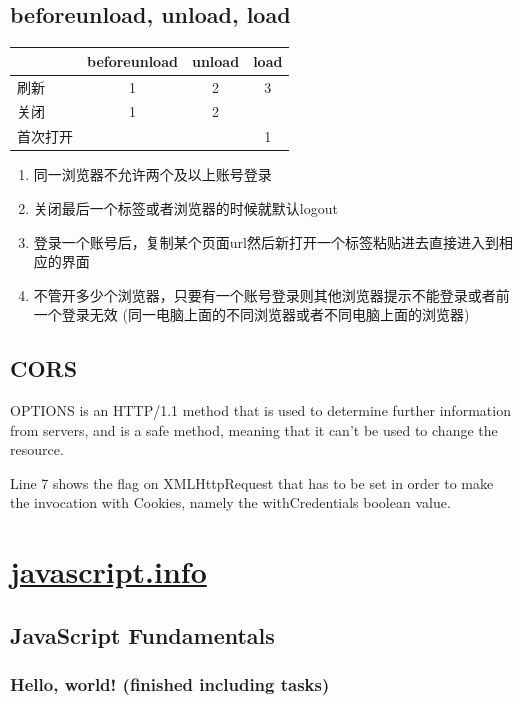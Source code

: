 \documentclass[a4paper, 12pt]{article}
\begin{document}
\subsection{beforeunload, unload, load}
\begin{table}[h]
\begin{tabular}{|lccc|}
\hline
 & beforeunload & unload & load \\
\hline
刷新 & 1 & 2 & 3 \\
\hline
关闭 & 1 & 2 &  \\
\hline
首次打开 &  &  & 1 \\
\hline
\end{tabular}
\end{table}

\begin{enumerate}
\item 同一浏览器不允许两个及以上账号登录

\item 关闭最后一个标签或者浏览器的时候就默认logout

\item 登录一个账号后，复制某个页面url然后新打开一个标签粘贴进去直接进入到相应的界面

\item 不管开多少个浏览器，只要有一个账号登录则其他浏览器提示不能登录或者前一个登录无效 (同一电脑上面的不同浏览器或者不同电脑上面的浏览器)
\end{enumerate}

\subsection{CORS}
OPTIONS is an HTTP/1.1 method that is used to determine further information from servers, and is a safe method, meaning that it can't be used to change the resource.

Line 7 shows the flag on XMLHttpRequest that has to be set in order to make the invocation with Cookies, namely the withCredentials boolean value.


\section{\href{https://javascript.info/}{javascript.info}}
\subsection{JavaScript Fundamentals}
\subsubsection{Hello, world! (finished including tasks)}
\end{document}
